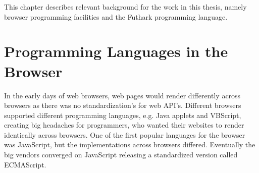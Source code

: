 \documentclass[11pt]{book}
\begin{document}
This chapter describes relevant background for the work in this thesis, namely browser programming facilities and the Futhark programming language.






\section{Programming Languages in the Browser}









In the early days of web browsers, web pages would render differently across browsers as there was no standardization's for web API's. Different browsers supported different programming languages, e.g. Java applets and VBScript, creating big headaches for programmers, who wanted their websites to render identically across browsers. One of the first popular languages for the browser was JavaScript, but the implementations across browsers differed. Eventually the big vendors converged on JavaScript releasing a standardized version called ECMAScript. 
\end{document}
